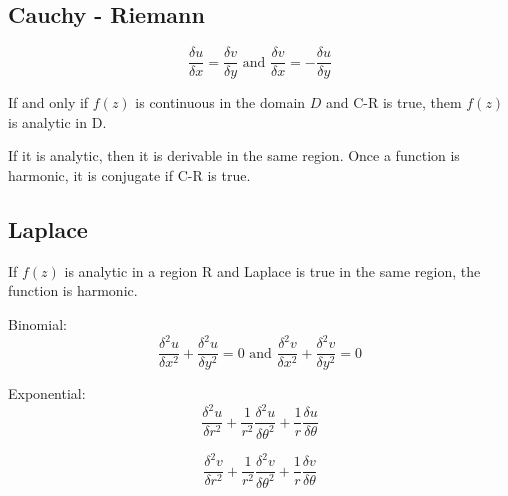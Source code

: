 \documentclass[letterpaper]{article}
\newcommand{\divline}{\noindent\makebox[\linewidth]{\rule{\textwidth}{0.4pt}}}
\begin{document}
	\divline
 
	\begin{multicols}{3}
		\section{Cauchy - Riemann}
		\[\frac{\delta u}{\delta x} = \frac{\delta v}{\delta y} \text{ and } \frac{\delta v}{\delta x} = - \frac{\delta u}{\delta y}\]
		
		If and only if \(f(z)\) is continuous in the domain \(D\) and C-R is true, them \(f(z)\) is analytic in D.
		
		If it is analytic, then  it is derivable in the same region. Once a function is harmonic, it is conjugate if C-R is true.
	\end{multicols}
 
	\divline
 
	\begin{multicols}{2}
		\section{Laplace}
			If \(f(z)\) is analytic in a region R and Laplace is true in the same region, the function is harmonic.
		
			Binomial:
			\[\frac{\delta^{2} u}{\delta x^{2}} + \frac{\delta^{2} u}{\delta y^{2}} = 0 \text{ and } \frac{\delta^{2} v}{\delta x^{2}} + \frac{\delta^{2} v}{\delta y^{2}} = 0\]
			
			Exponential:
			\[\frac{\delta^{2} u}{\delta r^{2}} + \frac{1}{r^{2}} \frac{\delta^{2} u}{\delta \theta^{2}} + \frac{1}{r} \frac{\delta u}{\delta \theta}\]
			
			\[\frac{\delta^{2} v}{\delta r^{2}} + \frac{1}{r^{2}} \frac{\delta^{2} v}{\delta \theta^{2}} + \frac{1}{r} \frac{\delta v}{\delta \theta}\]
	\end{multicols}
 
	\divline
 
\end{document}
